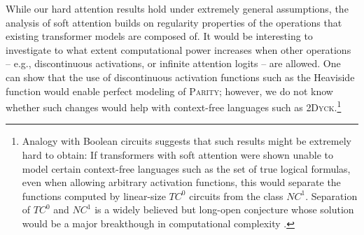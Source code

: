 \documentclass[11pt,a4paper]{article}
\newcounter{theorem}
\begin{document}
While our hard attention results hold under extremely general assumptions, the analysis of soft attention builds on regularity properties of the operations that existing transformer models are composed of.
It would be interesting to investigate to what extent computational power increases when other operations -- e.g., discontinuous activations, or infinite attention logits -- are allowed.
One can show that the use of discontinuous activation functions such as the Heaviside function would enable perfect modeling of \textsc{Parity}; however, we do not know whether such changes would help with context-free languages such as \textsc{2Dyck}.\footnote{Analogy with Boolean circuits suggests that such results might be extremely hard to obtain: If transformers with soft attention were shown unable to model certain context-free languages such as the set of true logical formulas, even when allowing arbitrary activation functions, this would separate the functions computed by linear-size $TC^0$ circuits from the class $NC^1$. Separation of $TC^0$ and $NC^1$ is a widely believed but long-open conjecture whose solution would be a major breakthough in computational complexity \cite{arora2009computational}.}








\end{document}
